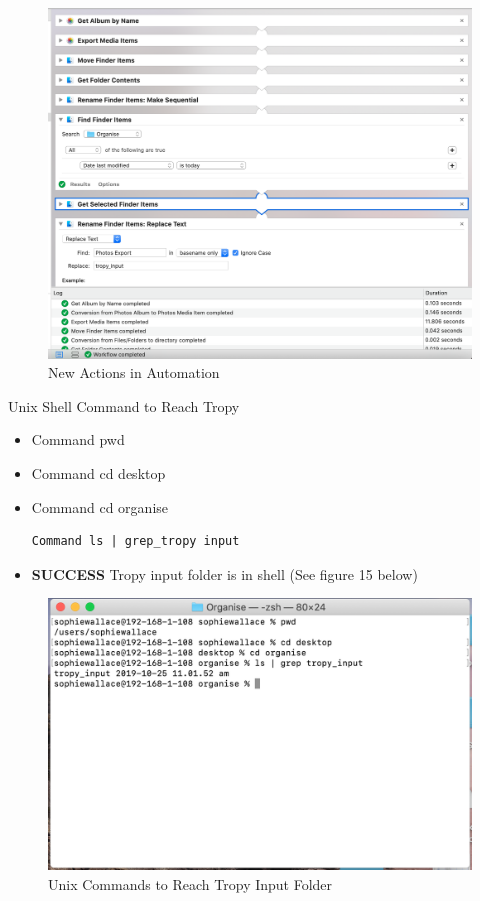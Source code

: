 \documentclass{article}
\begin{document}
\begin{figure}[H]
    \centering
    \includegraphics[width=\textwidth]{Images/Automator_5.png}
    \caption{New Actions in Automation}
    \label{fig:my_label}
\end{figure}

Unix Shell Command to Reach Tropy
\begin{itemize}
\item Command pwd 
\item Command cd desktop
\item Command cd organise

\begin{verbatim}
Command ls | grep_tropy input 
\end{verbatim}  
\item \textbf{SUCCESS} Tropy input folder is in shell (See figure 15 below)
\end{itemize}

\clearpage
\begin{figure}[H]
    \centering
    \includegraphics[width=\textwidth]{Images/Unix_1.png}
    \caption{Unix Commands to Reach Tropy Input Folder}
    \label{fig:my_label}
\end{figure}
\end{document}
